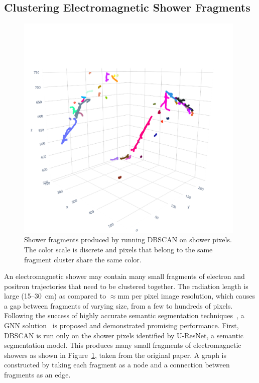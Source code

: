 \documentclass{ws-rv9x6}
\begin{document}
\subsection{Clustering Electromagnetic Shower Fragments}
\begin{figure}[t]
    \centering
    \includegraphics[width=0.98\textwidth]{figures/fragments.pdf}
    \caption{Shower fragments produced by running DBSCAN on shower pixels. The color scale is discrete and pixels that belong to the same fragment cluster share the same color.}
    \label{fig:clustering:gnn_input}
\end{figure}
An electromagnetic shower may contain many small fragments of electron and positron trajectories that need to be clustered together. The radiation length is large (15--30~cm) as compared to $\approx$mm per pixel image resolution, which causes a gap between fragments of varying size, from a few to hundreds of pixels. Following the success of highly accurate semantic segmentation techniques~\cite{domine_laura_2018_1300713}, a GNN solution~\cite{drielsma2020clustering} is proposed and demonstrated  promising performance. First, DBSCAN is run only on the shower pixels identified by U-ResNet, a semantic segmentation model. This produces many small fragments of electromagnetic showers as shown in Figure~\ref{fig:clustering:gnn_input}, taken from the original paper. A graph is constructed by taking each fragment as a node and a connection between fragments as an edge. 
\end{document}
